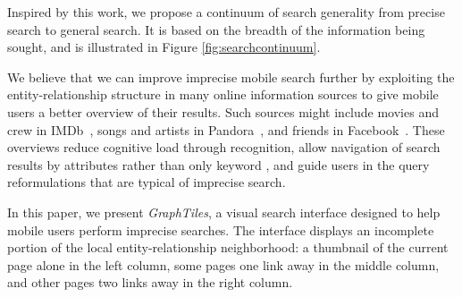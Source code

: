 Inspired by this work, we propose a continuum of search generality from precise search to general search. It is based on the breadth of the information being sought, and is illustrated in Figure \ref{fig:searchcontinuum}.

We believe that we can improve imprecise mobile search further by exploiting the entity-relationship structure in many online information sources to give mobile users a better overview of their results. Such sources might include movies and crew in IMDb~\cite{imdb}, songs and artists in Pandora~\cite{pandora}, and friends in Facebook~\cite{Facebook}. These overviews reduce cognitive load through recognition, allow navigation of search results by attributes rather than only keyword \cite{Hearst:2002}, and guide users in the query reformulations that are typical of imprecise search.

In this paper, we present \textit{GraphTiles}, a visual search interface designed to help mobile users perform imprecise searches. The interface displays an incomplete portion of the local entity-relationship neighborhood: a thumbnail of the current page alone in the left column, some pages one link away in the middle column, and other pages two links away in the right column. 
